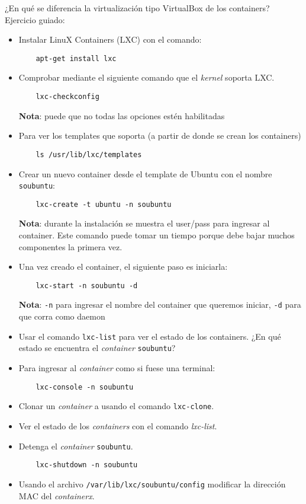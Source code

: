 \begin{questions}
\question ¿En qué se diferencia la virtualización tipo VirtualBox de los containers?
\question Ejercicio guiado:

\begin{itemize}
\item Instalar LinuX Containers (LXC) con el comando:
\begin{verbatim}
  	apt-get install lxc
\end{verbatim}
\item Comprobar mediante el siguiente comando que el \textit{kernel} soporta LXC.
\begin{verbatim}
  	lxc-checkconfig
\end{verbatim}
  \textbf{Nota}: puede que no todas las opciones estén habilitadas
\item Para ver los templates que soporta (a partir de donde se crean los containers)
\begin{verbatim}
  	ls /usr/lib/lxc/templates
\end{verbatim}
\item Crear un nuevo container desde el template de Ubuntu con el nombre
  \texttt{soubuntu}:
\begin{verbatim}
  	lxc-create -t ubuntu -n soubuntu
\end{verbatim}
  \textbf{Nota}: durante la instalación se muestra el user/pass para
  ingresar al container. Este comando puede tomar un tiempo porque debe
  bajar muchos componentes la primera vez.
\item Una vez creado el container, el siguiente paso es iniciarla:
\begin{verbatim}
  	lxc-start -n soubuntu -d
\end{verbatim}
  \textbf{Nota}: \texttt{-n} para ingresar el nombre del container que
  queremos iniciar, \texttt{-d} para que corra como daemon
\item Usar el comando \texttt{lxc-list} para ver el estado de los
  containers. ¿En qué estado se encuentra el \textit{container}
  \texttt{soubuntu}?
\item Para ingresar al \textit{container} como si fuese una terminal:
\begin{verbatim}
  	lxc-console -n soubuntu
\end{verbatim}
  
\item Clonar un \textit{container} a usando el comando \texttt{lxc-clone}.
\item Ver el estado de los \textit{containers} con el comando
  \textit{lxc-list}.
\item Detenga el \textit{container} \texttt{soubuntu}.
\begin{verbatim}
  	lxc-shutdown -n soubuntu
\end{verbatim}
\item Usando el archivo \texttt{/var/lib/lxc/soubuntu/config} modificar la
  dirección MAC del \textit{containerx}.


\end{itemize}
\end{questions}
